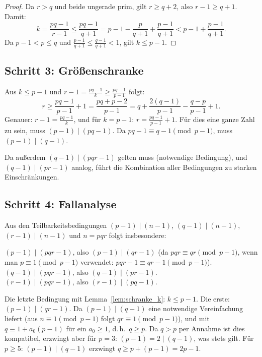 \documentclass[12pt,a4paper]{amsart}
\theoremstyle{definition}
\begin{document}
\begin{proof}
Da $r > q$ und beide ungerade prim, gilt $r \ge q + 2$, also $r - 1 \ge q + 1$.
Damit:
\[
  k = \frac{pq - 1}{r - 1} \le \frac{pq - 1}{q + 1} = p - 1 - \frac{p}{q+1} + \frac{p-1}{q+1} < p - 1 + \frac{p-1}{q+1}.
\]
Da $p - 1 < p \le q$ und $\tfrac{p-1}{q+1} \le \tfrac{q-1}{q+1} < 1$, gilt $k \le p - 1$.
\end{proof}

\subsection{Schritt 3: Größenschranke}

Aus $k \le p - 1$ und $r - 1 = \tfrac{pq-1}{k} \ge \tfrac{pq-1}{p-1}$ folgt:
\[
  r \ge \frac{pq - 1}{p - 1} + 1 = \frac{pq + p - 2}{p-1} = q + \frac{2(q-1)}{p-1} - \frac{q-p}{p-1} + 1.
\]
Genauer: $r - 1 = \tfrac{pq-1}{k}$, und für $k = p - 1$:
$r = \tfrac{pq-1}{p-1} + 1$. Für dies eine ganze Zahl zu sein, muss
$(p-1) \mid (pq - 1)$. Da $pq - 1 \equiv q - 1 \pmod{p-1}$, muss $(p-1) \mid (q-1)$.

\medskip
Da außerdem $(q-1) \mid (pqr - 1)$ gelten muss (notwendige Bedingung), und
$(q-1) \mid (pr - 1)$ analog, führt die Kombination aller Bedingungen zu
starken Einschränkungen.

\subsection{Schritt 4: Fallanalyse}

Aus den Teilbarkeitsbedingungen $(p-1) \mid (n-1)$, $(q-1) \mid (n-1)$, $(r-1) \mid (n-1)$
und $n = pqr$ folgt insbesondere:

\noindent$(p-1) \mid (pqr - 1)$, also $(p-1) \mid (qr - 1)$
(da $pqr \equiv qr \pmod{p-1}$, wenn man $p \equiv 1 \pmod{p-1}$ verwendet:
$pqr - 1 \equiv qr - 1 \pmod{p-1}$). \\
$(q-1) \mid (pqr - 1)$, also $(q-1) \mid (pr - 1)$. \\
$(r-1) \mid (pqr - 1)$, also $(r-1) \mid (pq - 1)$.

\medskip
\noindent Die letzte Bedingung mit Lemma~\ref{lem:schranke_k}: $k \le p - 1$.
Die erste: $(p-1) \mid (qr - 1)$. Da $(p-1) \mid (q-1)$ eine notwendige Vereinfachung
liefert (aus $n \equiv 1 \pmod{p-1}$ folgt $qr \equiv 1 \pmod{p-1}$), und mit
$q \equiv 1 + a_0(p-1)$ für ein $a_0 \ge 1$, d.\,h.\ $q \ge p$. Da $q > p$ per
Annahme ist dies kompatibel, erzwingt aber für $p = 3$:
$(p-1) = 2 \mid (q-1)$, was stets gilt. Für $p \ge 5$: $(p-1) \mid (q-1)$ erzwingt
$q \ge p + (p-1) = 2p - 1$.
\end{document}
